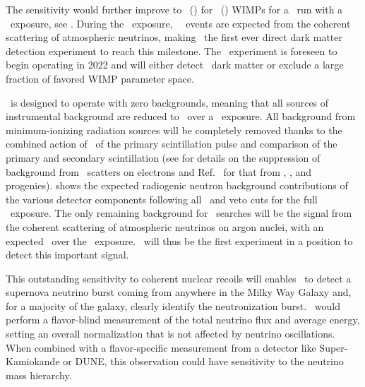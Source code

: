 The sensitivity would further improve to \DSkExtendedSensitivityOneGeVUnit\ (\DSkExtendedSensitivityTenGeVUnit) for \WIMPMassOneTev\ (\WIMPMassTenTev) WIMPs for a \DSkExtendedRunTimePlannedVerbal\ run with a \DSkExtendedExposure\ exposure, see .  During the \DSkExtendedExposure\ exposure, \DSkNuInducedBackgroundExtendedExposureBare\ \NRs\ events are expected from the coherent scattering of atmospheric neutrinos, making \DSks\ the first ever direct dark matter detection experiment to reach this milestone.  The \DSks\ experiment is foreseen to begin operating in 2022 and will either detect \WIMP\ dark matter or exclude a large fraction of favored WIMP parameter space.

\DSks\ is designed to operate with zero backgrounds, meaning that all sources of instrumental background are reduced to \BackgroundFreeRequirement\ over a \DSkExtendedExposure\ exposure.  All background from minimum-ionizing radiation sources will be completely removed thanks to the combined action of \PSD\ of the primary scintillation pulse and comparison of the primary and secondary scintillation (see  for details on the suppression of background from \PP\ scatters on electrons and Ref.~\cite{Aalseth:2018gq} for that from , , and progenies).   shows the expected radiogenic neutron background contributions of the various detector components following all \TPC\ and veto cuts for the full \DSks\ exposure.  The only remaining background for \WIMP\ searches will be the signal from the coherent scattering of atmospheric neutrinos on argon nuclei, with an expected \DSkNuInducedBackgroundExtendedExposureUnit\ over the \DSkExtendedExposure\ exposure.  \DSks\ will thus be the first experiment in a position to detect this important signal.

This outstanding sensitivity to coherent nuclear recoils will enables \DSks\ to detect a supernova neutrino burst coming from anywhere in the Milky Way Galaxy and, for a majority of the galaxy, clearly identify the neutronization burst. \DSks\ would perform a flavor-blind measurement of the total neutrino flux and average energy, setting an overall normalization that is not affected by neutrino oscillations. When combined with a flavor-specific measurement from a detector like Super-Kamiokande or DUNE, this observation could have sensitivity to the neutrino mass hierarchy. 



